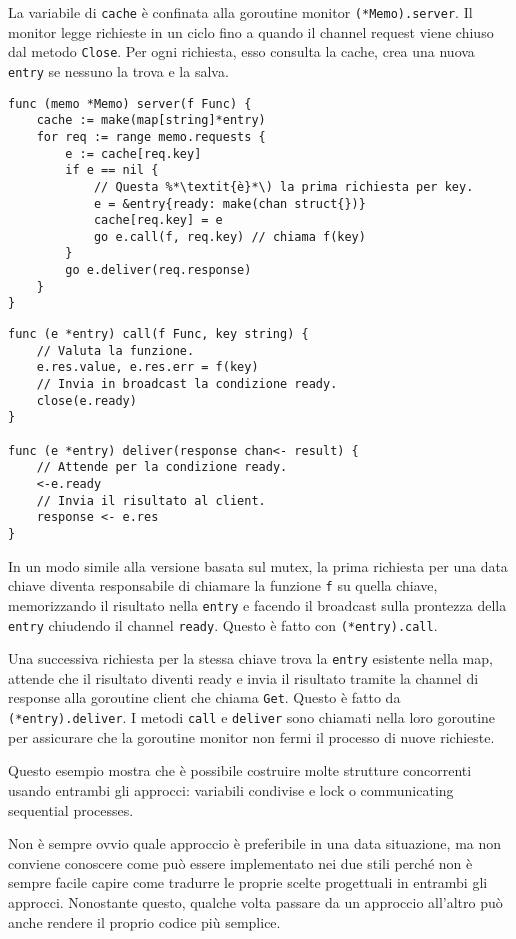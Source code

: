 La variabile di \verb|cache| è confinata alla goroutine monitor \verb|(*Memo).server|.
Il monitor legge richieste in un ciclo fino a quando il channel request viene chiuso dal metodo \verb|Close|.
Per ogni richiesta, esso consulta la cache, crea una nuova \verb|entry| se nessuno la trova e la salva.
\begin{lstlisting}[frame=single, label={lst:lstlisting9-7.11}]
func (memo *Memo) server(f Func) {
    cache := make(map[string]*entry)
    for req := range memo.requests {
        e := cache[req.key]
        if e == nil {
            // Questa %*\textit{è}*\) la prima richiesta per key.
            e = &entry{ready: make(chan struct{})}
            cache[req.key] = e
            go e.call(f, req.key) // chiama f(key)
        }
        go e.deliver(req.response)
    }
}
\end{lstlisting}
\begin{lstlisting}[frame=single, label={lst:lstlisting9-7.12}]
func (e *entry) call(f Func, key string) {
    // Valuta la funzione.
    e.res.value, e.res.err = f(key)
    // Invia in broadcast la condizione ready.
    close(e.ready)
}

func (e *entry) deliver(response chan<- result) {
    // Attende per la condizione ready.
    <-e.ready
    // Invia il risultato al client.
    response <- e.res
}
\end{lstlisting}
In un modo simile alla versione basata sul mutex, la prima richiesta per una data chiave diventa responsabile di chiamare la funzione \verb|f| su quella chiave, memorizzando il risultato nella \verb|entry| e facendo il broadcast sulla prontezza della \verb|entry| chiudendo il channel \verb|ready|.
Questo è fatto con \verb|(*entry).call|.

Una successiva richiesta per la stessa chiave trova la \verb|entry| esistente nella map, attende che il risultato diventi ready e invia il risultato tramite la channel di response alla goroutine client che chiama \verb|Get|.
Questo è fatto da \verb|(*entry).deliver|.
I metodi \verb|call| e \verb|deliver| sono chiamati nella loro goroutine per assicurare che la goroutine monitor non fermi il processo di nuove richieste.

Questo esempio mostra che è possibile costruire molte strutture concorrenti usando entrambi gli approcci: variabili condivise e lock o communicating sequential processes.

Non è sempre ovvio quale approccio è preferibile in una data situazione, ma non conviene conoscere come può essere implementato nei due stili perché non è sempre facile capire come tradurre le proprie scelte progettuali in entrambi gli approcci.
Nonostante questo, qualche volta passare da un approccio all'altro può anche rendere il proprio codice più semplice.